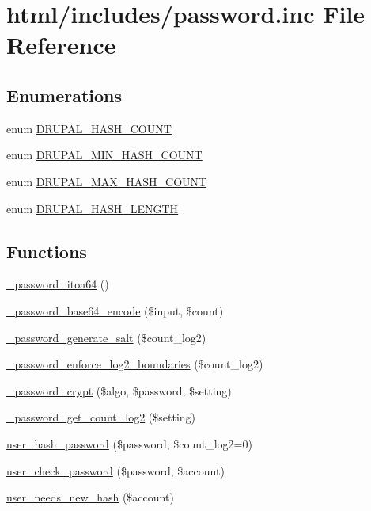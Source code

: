 \hypertarget{password_8inc}{
\section{html/includes/password.inc File Reference}
\label{password_8inc}
}
\subsection*{Enumerations}
\begin{DoxyCompactItemize}
\item 
enum \hyperlink{password_8inc_a6779dd88da34773d5f1b68cd3176fd2f}{DRUPAL\_\-HASH\_\-COUNT} 
\item 
enum \hyperlink{password_8inc_ab26271966114a05b9ccb6287c4848309}{DRUPAL\_\-MIN\_\-HASH\_\-COUNT} 
\item 
enum \hyperlink{password_8inc_aa0eb61e6083023579b85b387475b529f}{DRUPAL\_\-MAX\_\-HASH\_\-COUNT} 
\item 
enum \hyperlink{password_8inc_aeb9d94dcc991ed40a124d8ff153d2782}{DRUPAL\_\-HASH\_\-LENGTH} 
\end{DoxyCompactItemize}
\subsection*{Functions}
\begin{DoxyCompactItemize}
\item 
\hyperlink{password_8inc_acfa07cc7bbe581412346fcc7ec03cda3}{\_\-password\_\-itoa64} ()
\item 
\hyperlink{password_8inc_ab987820d3546d9284a976236fa42fa59}{\_\-password\_\-base64\_\-encode} (\$input, \$count)
\item 
\hyperlink{password_8inc_a0ebe31e5a38758a91dfd23d98f2b719a}{\_\-password\_\-generate\_\-salt} (\$count\_\-log2)
\item 
\hyperlink{password_8inc_a65b1a9f521b456c95ec8f8542bd5f59b}{\_\-password\_\-enforce\_\-log2\_\-boundaries} (\$count\_\-log2)
\item 
\hyperlink{password_8inc_a857b6008d6928c55df3823524d5c30d2}{\_\-password\_\-crypt} (\$algo, \$password, \$setting)
\item 
\hyperlink{password_8inc_a9af4ef28bcef6a4f53e9eed9735848b5}{\_\-password\_\-get\_\-count\_\-log2} (\$setting)
\item 
\hyperlink{password_8inc_a7fa51cbbe5dd15f39953097ea25eb237}{user\_\-hash\_\-password} (\$password, \$count\_\-log2=0)
\item 
\hyperlink{password_8inc_a8fca5fd75cd7a3c609e21a48ef087868}{user\_\-check\_\-password} (\$password, \$account)
\item 
\hyperlink{password_8inc_a5c5ff8dd0c7fb7880535bacd445a5574}{user\_\-needs\_\-new\_\-hash} (\$account)
\end{DoxyCompactItemize}


